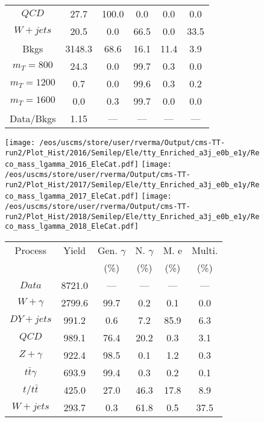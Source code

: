\begin{figure}
\begin{minipage}[c]{0.32\textwidth}
{\begin{tabular}{cccccc}
$ QCD $ &  27.7 &  100.0 &  0.0 &  0.0 &  0.0\\
$ W+jets $ &  20.5 &  0.0 &  66.5 &  0.0 &  33.5\\
Bkgs &  3148.3 &  68.6 &  16.1 &  11.4 &  3.9\\
$ m_{T} = 800 $ &  24.3 &  0.0 &  99.7 &  0.3 &  0.0\\
$ m_{T} = 1200 $ &  0.7 &  0.0 &  99.6 &  0.3 &  0.2\\
$ m_{T} = 1600 $ &  0.0 &  0.3 &  99.7 &  0.0 &  0.0\\
Data/Bkgs &  1.15 &  --- &  --- &  --- &  ---\\
\hline
\end{tabular}
}
\end{minipage}
\end{figure}

\begin{figure}
\centering
\texttt{[image: /eos/uscms/store/user/rverma/Output/cms-TT-run2/Plot\_Hist/2016/Semilep/Ele/tty\_Enriched\_a3j\_e0b\_e1y/Reco\_mass\_lgamma\_2016\_EleCat.pdf]}
\texttt{[image: /eos/uscms/store/user/rverma/Output/cms-TT-run2/Plot\_Hist/2017/Semilep/Ele/tty\_Enriched\_a3j\_e0b\_e1y/Reco\_mass\_lgamma\_2017\_EleCat.pdf]}
\texttt{[image: /eos/uscms/store/user/rverma/Output/cms-TT-run2/Plot\_Hist/2018/Semilep/Ele/tty\_Enriched\_a3j\_e0b\_e1y/Reco\_mass\_lgamma\_2018\_EleCat.pdf]}
\begin{minipage}[c]{0.32\textwidth}
\centering
\tiny{
\begin{tabular}{cccccc}
\hline
Process & Yield & Gen. $\gamma$ & N. $\gamma$ & M. e & Multi. \\
 &  & (\%) & (\%) & (\%) & (\%)  \\
\hline
                                                                      $ Data $ &  8721.0 &  --- &  --- &  --- &  ---\\
$ W+\gamma $ &  2799.6 &  99.7 &  0.2 &  0.1 &  0.0\\
$ DY+jets $ &  991.2 &  0.6 &  7.2 &  85.9 &  6.3\\
$ QCD $ &  989.1 &  76.4 &  20.2 &  0.3 &  3.1\\
$ Z+\gamma $ &  922.4 &  98.5 &  0.1 &  1.2 &  0.3\\
$ t\bar{t}\gamma $ &  693.9 &  99.4 &  0.3 &  0.2 &  0.1\\
$ t/t\bar{t} $ &  425.0 &  27.0 &  46.3 &  17.8 &  8.9\\
$ W+jets $ &  293.7 &  0.3 &  61.8 &  0.5 &  37.5\\

\end{tabular}}
\end{minipage}
\end{figure}
